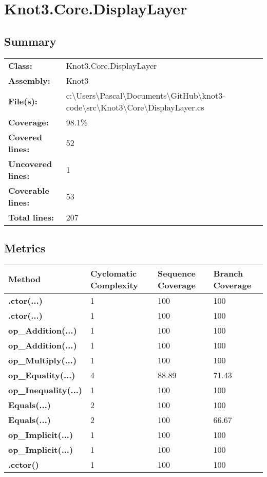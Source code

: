 \documentclass[a4paper,10pt]{article}
\begin{document}
\section{Knot3.Core.DisplayLayer}
\subsection{Summary}
\begin{longtable}[l]{ll}
\textbf{Class:} & Knot3.Core.DisplayLayer\\
\textbf{Assembly:} & Knot3\\
\textbf{File(s):} & \begin{minipage}[t]{12cm}{c:\textbackslash Users\textbackslash Pascal\textbackslash Documents\textbackslash GitHub\textbackslash knot3-code\textbackslash src\textbackslash Knot3\textbackslash Core\textbackslash DisplayLayer.cs}\end{minipage} \\
\textbf{Coverage:} & 98.1\%\\
\textbf{Covered lines:} & 52\\
\textbf{Uncovered lines:} & 1\\
\textbf{Coverable lines:} & 53\\
\textbf{Total lines:} & 207\\
\end{longtable}
\subsection{Metrics}
\begin{longtable}[l]{|l|l|l|l|}
\hline
\textbf{Method} & \textbf{Cyclomatic Complexity} & \textbf{Sequence Coverage} & \textbf{Branch Coverage}\\
\hline
\textbf{.ctor(...)} & 1 & 100 & 100\\
\hline
\textbf{.ctor(...)} & 1 & 100 & 100\\
\hline
\textbf{op\_Addition(...)} & 1 & 100 & 100\\
\hline
\textbf{op\_Addition(...)} & 1 & 100 & 100\\
\hline
\textbf{op\_Multiply(...)} & 1 & 100 & 100\\
\hline
\textbf{op\_Equality(...)} & 4 & 88.89 & 71.43\\
\hline
\textbf{op\_Inequality(...)} & 1 & 100 & 100\\
\hline
\textbf{Equals(...)} & 2 & 100 & 100\\
\hline
\textbf{Equals(...)} & 2 & 100 & 66.67\\
\hline
\textbf{op\_Implicit(...)} & 1 & 100 & 100\\
\hline
\textbf{op\_Implicit(...)} & 1 & 100 & 100\\
\hline
\textbf{.cctor()} & 1 & 100 & 100\\
\hline
\end{longtable}
\end{document}
